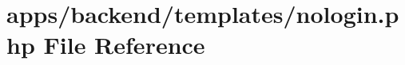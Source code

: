 \hypertarget{nologin_8php}{\section{apps/backend/templates/nologin.php File Reference}
\label{nologin_8php}
}
